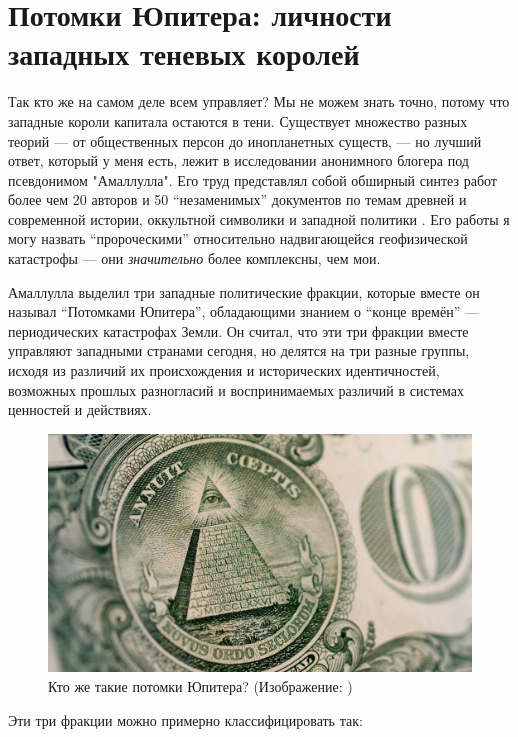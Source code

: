 \documentclass[10pt,twocolumn,letterpaper]{article}
\begin{document}
\section{Потомки Юпитера: личности западных теневых королей}

Так кто же на самом деле всем управляет? Мы не можем знать точно, потому что западные короли капитала остаются в тени. Существует множество разных теорий — от общественных персон до инопланетных существ, — но лучший ответ, который у меня есть, лежит в исследовании анонимного блогера под псевдонимом "Амаллулла". Его труд представлял собой обширный синтез работ более чем 20 авторов и 50 “незаменимых” документов по темам древней и современной истории, оккультной символики и западной политики \cite{33,34}. Его работы я могу назвать “пророческими” относительно надвигающейся геофизической катастрофы — они \textit{значительно} более комплексны, чем мои.

Амаллулла выделил три западные политические фракции, которые вместе он называл “Потомками Юпитера”, обладающими знанием о “конце времён” — периодических катастрофах Земли. Он считал, что эти три фракции вместе управляют западными странами сегодня, но делятся на три разные группы, исходя из различий их происхождения и исторических идентичностей, возможных прошлых разногласий и воспринимаемых различий в системах ценностей и действиях.


\begin{figure}[t]
\begin{center}
   \includegraphics[width=1\linewidth]{illuminati.jpg}
\end{center}
   \caption{Кто же такие потомки Юпитера? (Изображение: \cite{35})}
\label{fig:10}
\label{fig:onecol}
\end{figure}

Эти три фракции можно примерно классифицировать так:
\end{document}
